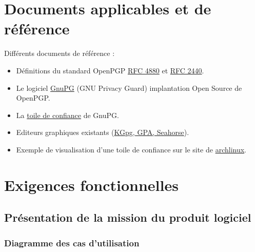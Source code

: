 \documentclass{../res/univ-projet}
\begin{document}
\section{Documents applicables et de référence}
Différents documents de référence :
\begin{itemize}
\item Définitions du standard OpenPGP \href{http://tools.ietf.org/html/rfc4880}{RFC 4880}
  et \href{http://abcdrfc.free.fr/rfc-vf/pdf/rfc2440.pdf}{RFC 2440}.
\item Le logiciel \href{https://www.gnupg.org/}{GnuPG} (GNU Privacy Guard) implantation Open Source
  de OpenPGP.
\item La \href{https://www.gnupg.org/gph/fr/manual.html#AEN541}{toile de confiance} de GnuPG.
\item Editeurs graphiques existants 
  (\href{http://www.gnupg.org/related_software/frontends.en.html}{KGpg, GPA, Seahorse}).
\item Exemple de visualisation d'une toile de confiance sur le site de 
  \href{https://www.archlinux.org/master-keys/#visualization}{archlinux}.
\end{itemize}



\section{Exigences fonctionnelles}
\subsection{Présentation de la mission du produit logiciel}

\subsubsection{Diagramme des cas d'utilisation}
\end{document}
